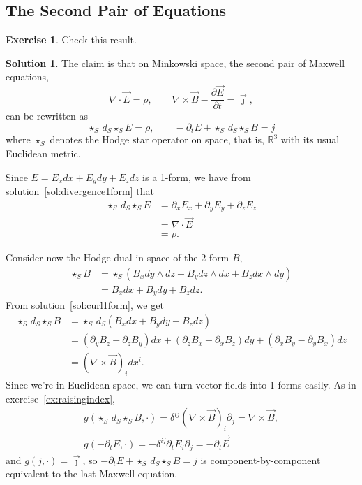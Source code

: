 \documentclass[11pt, a4paper]{article}
\theoremstyle{definition}
\newtheorem{ex}{Exercise}[part]
\newtheorem{sol}{Solution}[part]
\begin{document}
\subsection{The Second Pair of Equations}

\begin{ex}

Check this result.

\end{ex}

\begin{sol}

The claim is that on Minkowski space, the second pair of Maxwell equations,
\[
    \nabla \cdot \vec{E} = \rho, \qquad
    \nabla \times \vec{B} - \frac{\partial \vec{E}}{\partial t} = \vec{\jmath},
\]
can be rewritten as
\[
    \star_S \, d_S \star_S E = \rho, \qquad
    -\partial_t E + \star_S \, d_S \star_S B = j
\]
where $\star_S$ denotes the Hodge star operator on space, that is, $\mathbb{R}^3$ with its usual Euclidean metric.

Since $E = E_x dx + E_y dy + E_z dz$ is a 1-form, we have from solution~\ref{sol:divergence1form} that
\begin{align*}
    \star_S \, d_S \star_S E &= \partial_x E_x + \partial_y E_y + \partial_z E_z \\
                             &= \nabla \cdot \vec{E} \\
                             &= \rho.
\end{align*}

Consider now the Hodge dual in space of the 2-form $B$,
\begin{align*}
    \star_S B &= \star_S (B_x dy \wedge dz + B_y dz \wedge dx + B_z dx \wedge dy) \\
              &= B_x dx + B_y dy + B_z dz.
\end{align*}
From solution~\ref{sol:curl1form}, we get
\begin{align*}
    \star_S \, d_S \star_S B &= \star_S \, d_S (B_x dx + B_y dy + B_z dz) \\
        &= \left(\partial_y B_z - \partial_z B_y\right) dx
            + \left(\partial_z B_x - \partial_x B_z\right) dy
            + \left(\partial_x B_y - \partial_y B_x\right) dz \\
        &= {(\nabla \times \vec{B})}_i dx^i.
\end{align*}
Since we're in Euclidean space, we can turn vector fields into 1-forms easily. As in exercise~\ref{ex:raisingindex},
\begin{gather*}
    g(\star_S \, d_S \star_S B, \cdot)
        = \delta^{ij} {(\nabla \times \vec{B})}_i \partial_j
        = \nabla \times \vec{B}, \\
    g(-\partial_t E, \cdot) = -\delta^{ij} \partial_t E_i \partial_j = -\partial_t \vec{E}
\end{gather*}
and $g(j, \cdot) = \vec{\jmath}$,
so $-\partial_t E + \star_S \, d_S \star_S B = j$ is component-by-component equivalent to the last Maxwell equation.

\end{sol}
\end{document}
